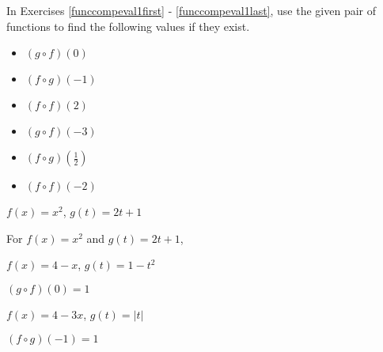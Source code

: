 \documentclass{ximera}
\begin{document}
	\author{Stitz-Zeager}



\label{ExercisesforFunctionComposition}


In Exercises \ref{funccompeval1first} - \ref{funccompeval1last}, use the given pair of functions to find the following values if they exist.



\begin{itemize}

\item  $(g\circ f)(0)$

\item  $(f\circ g)(-1)$

\item  $(f \circ f)(2)$

\item  $(g\circ f)(-3)$

\item  $(f\circ g)\left(\frac{1}{2}\right)$

\item  $(f \circ f)(-2)$

\end{itemize}







\begin{question}
$f(x) = x^2$, $g(t) = 2t+1$
\begin{solution}
For  $f(x) = x^2$ and $g(t) = 2t+1$,



\end{solution}

\end{question}

\begin{question}
$f(x) = 4-x$, $g(t) = 1-t^2$

\begin{solution}
$(g\circ f)(0) = 1$
\end{solution}

\end{question}

\begin{question}
$f(x) = 4-3x$, $g(t) = |t|$
\begin{solution}
$(f\circ g)(-1) = 1$
\end{solution}

\end{question}
\end{document}
